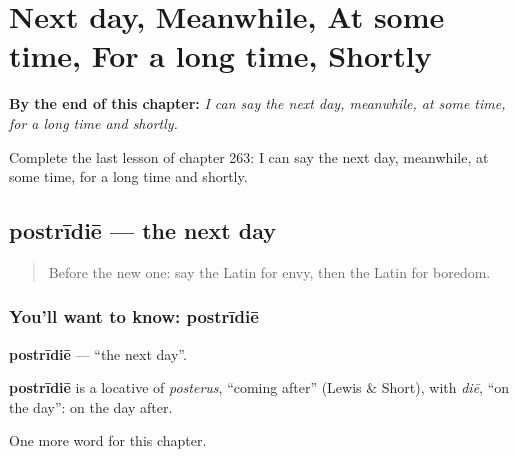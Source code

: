 
\chapter{Next day, Meanwhile, At some time, For a long time, Shortly}
\label{ch:la-next-day-meanwhile-at-some-time-for-a-long-time-shortly}

\begin{chapteropening}
\textbf{By the end of this chapter:} \emph{I can say the next day, meanwhile, at some time, for a long time and shortly.}

Complete the last lesson of chapter 263: I can say the next day, meanwhile, at some time, for a long time and shortly.
\end{chapteropening}

\section[postrīdiē]{postrīdiē — the next day}

\label{lesson:LA-C263-postridie}



\begin{quote}
Before the new one: say the Latin for envy, then the Latin for boredom.
\end{quote}

\subsection*{You'll want to know: postrīdiē}
\textbf{postrīdiē} — \textquotedblleft{}the next day\textquotedblright{}.

\begin{cousinweb}
\textbf{postrīdiē} is a locative of \emph{posterus}, \textquotedblleft{}coming after\textquotedblright{} (Lewis \& Short), with \emph{diē}, \textquotedblleft{}on the day\textquotedblright{}: on the day after.
\end{cousinweb}

\begin{grammarlens}[title={What you've built}]
One more word for this chapter.
\end{grammarlens}

